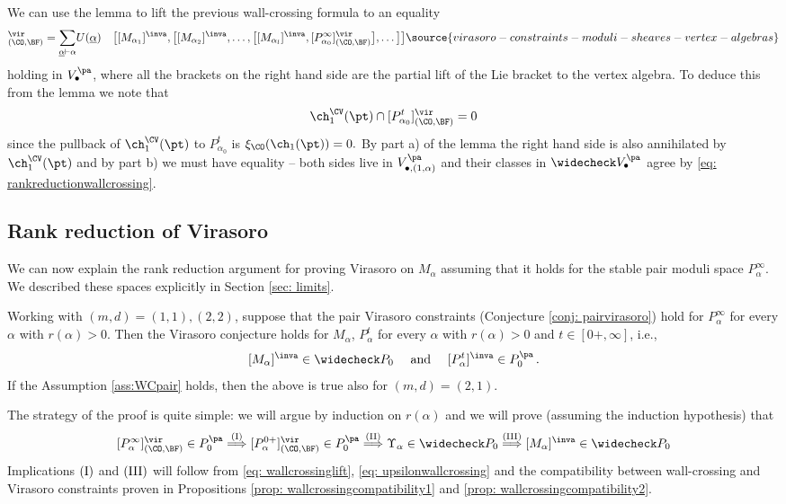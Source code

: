 We can use the lemma to lift the previous wall-crossing formula to an equality
\begin{align}[P_{\alpha}^{0+}]^\vir_{(\CO,\BF)}=\sum_{\underline{\alpha} \vdash \alpha
}&U(\underline{\alpha})
&\big[[M_{\alpha_1}]^\inva,\big[[M_{\alpha_2}]^\inva,\ldots, \big[[M_{\alpha_l}]^\inva,[P_{\alpha_0}^\infty]^\vir_{(\CO,\BF)}  \big],\ldots \big]\big]
\label{eq: wallcrossinglift}
\source{virasoro-constraints-moduli-sheaves-vertex-algebras}
\end{align}
holding in $V_\bullet^{\pa}$, where all the brackets on the right hand side are the partial lift of the Lie bracket to the vertex algebra. To deduce this from the lemma we note that
\[\ch_1^\CV(\pt)\cap [P_{\alpha_0}^t]^\vir_{(\CO,\BF)}=0\]
since the pullback of $\ch_1^\CV(\pt)$ to $P_{\alpha_0}^t$ is $\xi_\CO(\ch_1(\pt))=0.$ By part a) of the lemma the right hand side is also annihilated by $\ch_1^\CV(\pt)$ and by part b) we must have equality -- both sides live in $V^{\pa}_{\bullet, (1, \alpha)}$ and their classes in $\widecheck V_\bullet^{\pa}$ agree by \eqref{eq: rankreductionwallcrossing}.


\subsection{Rank reduction of Virasoro}

We can now explain the rank reduction argument for proving Virasoro on $M_\alpha$ assuming that it holds for the stable pair moduli space $P_\alpha^\infty$. We described these spaces explicitly in Section \ref{sec: limits}.

\begin{theorem}
\notready\label{thm: rankreduction}

Working with $(m,d)= (1,1),(2,2)$, suppose that the pair Virasoro constraints (Conjecture \ref{conj: pairvirasoro}) hold for $P_\alpha^\infty$ for every $\alpha$ with $r(\alpha)> 0$.
Then the Virasoro conjecture holds for $M_\alpha$, $P^t_{\alpha}$ for every $\alpha$ with $r(\alpha)>0$ and $t\in [0+, \infty]$, i.e.,
\[[M_\alpha]^\inva \in \widecheck P_0\quad \textup{ and }\quad [P_\alpha^t]^\inva \in P_0^{\pa}\,.\]
If the Assumption \ref{ass:WCpair} holds, then the above is true also for $(m,d) =(2,1)$.
\end{theorem}

The strategy of the proof is quite simple: we will argue by induction on $r(\alpha)$ and we will prove (assuming the induction hypothesis) that
\[[P_\alpha^\infty]^\vir_{(\CO, \BF)}\in P_0^{\pa}\overset{(\textup{I})}{\Longrightarrow} [P_\alpha^{0+}]^\vir_{(\CO, \BF)}\in P_0^{\pa}\overset{(\textup{II})}{\Longrightarrow} \Upsilon_\alpha\in \widecheck P_0\overset{(\textup{III})}{\Longrightarrow} [M_\alpha]^{\inva}\in  \widecheck P_0\]
Implications $(\textup{I})$ and $(\textup{III})$ will follow from \eqref{eq: wallcrossinglift}, \eqref{eq: upsilonwallcrossing} and the compatibility between wall-crossing and Virasoro constraints proven in Propositions \ref{prop: wallcrossingcompatibility1} and \ref{prop: wallcrossingcompatibility2}.

